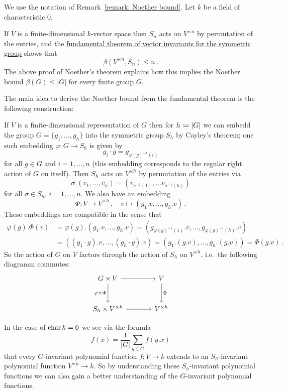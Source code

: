 \begin{fluff}
  We use the notation of Remark~\ref{remark: Noether bound}.
  Let $k$ be a field of characteristic $0$.
  
  If $V$ is a finite-dimensional $k$-vector space then $S_n$ acts on $V^{\times n}$ by permutation of the entries, and the \hyperref[theorem: fundamental theorem of vector invariants for the symmetric group]{fundamental theorem of vector invariants for the symmetric group} shows that
  \[
          \beta(V^{\times n}, S_n)
    \leq  n \,.
  \]
  The above proof of Noether’s theorem explains how this implies the Noether bound $\beta(G) \leq |G|$ for every finite group $G$.
  
  The main idea to derive the Noether bound from the fundamental theorem is the following construction:
  
  If $V$ is a finite-dimensional representation of $G$ then for $h \coloneqq |G|$ we can embedd the group $G = \{g_1, \dotsc, g_h\}$ into the symmetric group $S_h$ by Cayley’s theorem;
  one such embedding $\varphi \colon G \to S_h$ is given by
  \[
    g_i \cdot g
    = g_{\varphi(g)^{-1}(i)}
  \]
  for all $g \in G$ and $i = 1, \dotsc, n$ (this embedding corresponds to the regular right action of $G$ on itself).
  Then $S_h$ acts on $V^{\times h}$ by permutation of the entries via
  \[
      \sigma.(v_1, \dotsc, v_h)
    = (v_{\sigma^{-1}(1)}, \dotsc v_{\sigma^{-1}(h)})
  \]
  for all $\sigma \in S_h$, $i = 1, \dotsc, n$.
  We also have an embedding
  \[
            \Phi
    \colon  V
    \to     V^{\times h} \,,
    \quad   v
    \mapsto \left( g_1.v, \dotsc, g_h.v \right) \,.
  \]
  These embeddings are compatible in the sense that
  \begin{align*}
        \varphi(g).\Phi(v)
    &=  \varphi(g).(g_1.v, \dotsc, g_h.v)
     =  \left( g_{\varphi(g)^{-1}(1)}.v, \dotsc, g_{\varphi(g)^{-1}(h)}.v \right) \\
    &=  ( (g_1 \cdot g).v, \dotsc, (g_h \cdot g).v )
     =  ( g_1.(g.v), \dotsc, g_h.(g.v) )
     =  \Phi(g.v) \,.
  \end{align*}
  So the action of $G$ on $V$ factors through the action of $S_h$ on $V^{\times h}$, i.e.\ the following diagramm commutes:
  \[
    \begin{tikzcd}[sep = large]
        G \times V
        \arrow{r}
        \arrow{d}[left]{\varphi \times \Phi}
      & V
        \arrow{d}[right]{\Phi}
      \\
        S_h \times V^{\times h}
        \arrow{r}
      & V^{\times h}
    \end{tikzcd}
  \]

  
  In the case of $\operatorname{char}{k} = 0$ we see via the formula
  \[
      f(x)
    = \frac{1}{|G|} \sum_{g \in G} f(g.x)
  \]
  that every $G$-invariant polynomial function $f \colon V \to k$ extends to an $S_h$-invariant polynomial function $V^{\times h} \to k$.
  So by understanding these $S_h$-invariant polynomial functions we can also gain a better understanding of the $G$-invariant polynomial functions.
\end{fluff}





